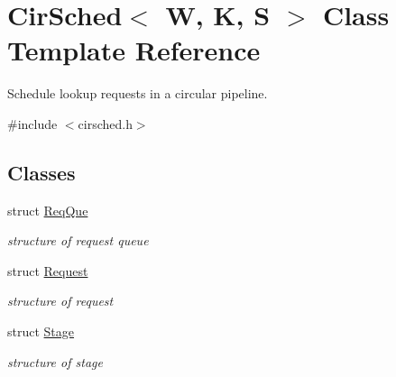 \hypertarget{classCirSched}{\section{Cir\-Sched$<$ W, K, S $>$ Class Template Reference}
\label{classCirSched}
}


Schedule lookup requests in a circular pipeline.  




{\ttfamily \#include $<$cirsched.\-h$>$}

\subsection*{Classes}
\begin{DoxyCompactItemize}
\item 
struct \hyperlink{structCirSched_1_1ReqQue}{Req\-Que}
\begin{DoxyCompactList}\small\item\em structure of request queue \end{DoxyCompactList}\item 
struct \hyperlink{structCirSched_1_1Request}{Request}
\begin{DoxyCompactList}\small\item\em structure of request \end{DoxyCompactList}\item 
struct \hyperlink{structCirSched_1_1Stage}{Stage}
\begin{DoxyCompactList}\small\item\em structure of stage \end{DoxyCompactList}\end{DoxyCompactItemize}

